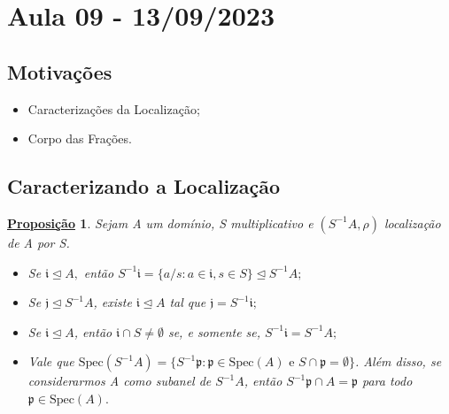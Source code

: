 \documentclass{article}
\newtheorem*{prop*}{\underline{Proposi\c c\~ao}}
\begin{document}
\section{Aula 09 - 13/09/2023}
\subsection{Motivações}
\begin{itemize}
  \item Caracterizações da Localização;
  \item Corpo das Frações.
\end{itemize}
\subsection{Caracterizando a Localização}
\begin{prop*}
  Sejam A um domínio, S multiplicativo e \((S^{-1}A, \rho )\) localização de A por S.
  \begin{itemize}
    \item[1)] Se \(\mathfrak{i}\trianglelefteq{A},\) então \(S^{-1}\mathfrak{i} = \{a/s: a\in \mathfrak{i}, s\in S\}\trianglelefteq{S^{-1}A};\) 
    \item[2)] Se \(\mathfrak{j}\trianglelefteq{S^{-1}A}\), existe \(\mathfrak{i}\trianglelefteq{A}\) tal que \(\mathfrak{j} = S^{-1}\mathfrak{i};\)
    \item[3)] Se \(\mathfrak{i}\trianglelefteq{A}\), então \(\mathfrak{i}\cap S \neq\emptyset\) se, e somente se, \(S^{-1}\mathfrak{i} = S^{-1}A;\)
    \item[4)] Vale que \(\mathrm{Spec}(S^{-1}A) = \{S^{-1}\mathfrak{p}:\mathfrak{p}\in \mathrm{Spec}(A) \text{ e } S\cap \mathfrak{p}=\emptyset\}\). Além disso, se considerarmos A como subanel de \(S^{-1}A\),
      então \(S^{-1}\mathfrak{p}\cap A = \mathfrak{p}\) para todo \(\mathfrak{p}\in \mathrm{Spec}(A).\)
  \end{itemize}
\end{prop*}
\end{document}

